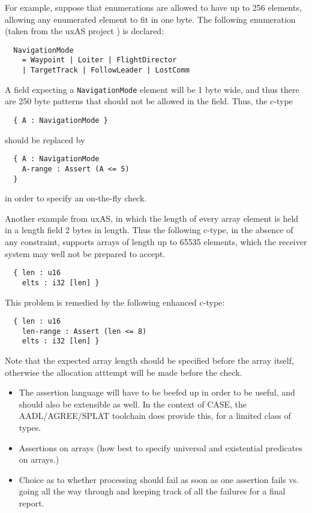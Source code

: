 \documentclass[svgnames]{llncs}
\begin{document}
\begin{example}
 For example, suppose that enumerations are allowed to have up to 256
 elements, allowing any enumerated element to fit in one byte. The following
 enumeration (taken from the uxAS project \cite{}) is declared:
\begin{verbatim}
  NavigationMode
    = Waypoint | Loiter | FlightDirector
    | TargetTrack | FollowLeader | LostComm
\end{verbatim}

A field expecting a \verb+NavigationMode+ element will be 1 byte wide,
and thus there are 250 byte patterns that should not be allowed in the field. Thus, the c-type

\begin{verbatim}
  { A : NavigationMode }
\end{verbatim}

should be replaced by

\begin{verbatim}
  { A : NavigationMode
    A-range : Assert (A <= 5)
  }
\end{verbatim}

\noindent in order to specify an on-the-fly check.

\end{example}

Another example from uxAS, in which the length of every array element
is held in a length field 2 bytes in length. Thus the following
c-type, in the absence of any constraint, supports arrays of length up
to 65535 elements, which the receiver system may well not be prepared
to accept.

\begin{verbatim}
  { len : u16
    elts : i32 [len] }
\end{verbatim}

This problem is remedied by the following enhanced c-type:

\begin{verbatim}
  { len : u16
    len-range : Assert (len <= 8)
    elts : i32 [len] }
\end{verbatim}

\noindent Note that the expected array length should be specified
before the array itself, otherwise the allocation atttempt will be
made before the check.

\begin{itemize}

\item The assertion language will have to be beefed up in order to be
  useful, and should also be extensible as well. In the context of
  CASE, the AADL/AGREE/SPLAT toolchain does provide this, for a
  limited class of types.

\item Assertions on arrays (how best to specify universal and
  existential predicates on arrays.)

\item Choice as to whether processing should fail as soon as one
  assertion fails vs. going all the way through and keeping track of
  all the failures for a final report.

\end{itemize}
\end{document}
